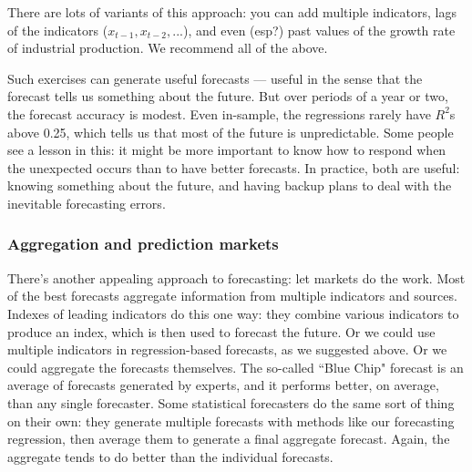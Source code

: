 \documentclass[letterpaper,12pt]{article}
\begin{document}
There are lots of variants of this approach:
you can add multiple indicators, 
lags of the indicators  ($x_{t-1}, x_{t-2}, ...$), 
and even (esp?) past values of the growth rate of industrial 
production.
We recommend all of the above.  


Such exercises can generate useful forecasts --- 
useful in the sense that the forecast tells us something about the future.
But over periods of a year or two, 
the forecast accuracy is modest.
Even in-sample, the regressions rarely have $R^2$s above 0.25, 
which tells us that most of the future is unpredictable.
Some people see a lesson in this:  it might be more important
to know how to respond when the unexpected occurs
than to have better forecasts.   
In practice, both are useful:  knowing something about the future, 
and having backup plans to deal with the inevitable forecasting errors.  


\subsubsection*{Aggregation and prediction markets}

There's another appealing approach to forecasting:  
let markets do the work.  
Most of the best forecasts aggregate information from multiple
indicators and sources.  
Indexes of leading indicators do this one way:  they
combine various indicators to produce an index, which is then used
to forecast the future.  
Or we could use multiple indicators in regression-based forecasts, 
as we suggested above.  
Or we could aggregate the forecasts themselves.  
The so-called ``Blue Chip" forecast is an average of forecasts generated by experts, and it performs better, on average, than any single forecaster.  
Some statistical forecasters do the same sort of thing on their own:  
they generate multiple forecasts with methods like our forecasting regression,
then average them to generate a final aggregate forecast. Again,
the aggregate tends to do better than the individual forecasts.
\end{document}
